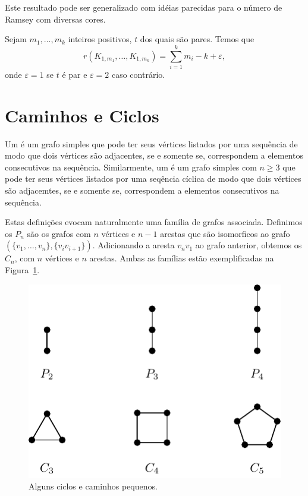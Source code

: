 Este resultado pode ser generalizado com idéias parecidas para o número de Ramsey com diversas cores.

\begin{theorem}
Sejam $m_1, \dots, m_k$ inteiros positivos, $t$ dos quais são pares. Temos que
\[r(K_{1,m_1}, \dotsc,  K_{1,m_k}) = \sum_{i=1}^{k} m_i  - k + \varepsilon,\]
onde $\varepsilon = 1$ se $t$ é par e $\varepsilon = 2$ caso contrário.
\end{theorem}


\section{Caminhos e Ciclos}

Um  é um grafo simples que pode ter seus vértices listados por uma sequência de modo que dois vértices são adjacentes, se e somente se, correspondem a elementos consecutivos na sequência. Similarmente, um  é um grafo simples com $n \geq 3$ que pode ter seus vértices listados por uma seqência cíclica de modo que dois vértices são adjacemtes, se e somente se, correspondem a elementos consecutivos na sequência.

Estas definições evocam naturalmente uma família de grafos associada. Definimos os  $P_n$ são os grafos com $n$ vértices e $n-1$ arestas que são isomorficos ao grafo $(\{v_1,\dots,v_n\}, \{v_iv_{i+1}\})$. Adicionando a aresta $v_nv_1$ ao grafo anterior, obtemos os  $C_n$, com $n$ vértices e $n$ arestas. Ambas as famílias estão exemplificadas na Figura~\ref{graph:fig:cyclepath}.

\begin{figure}[ht!]
\centering
\includegraphics{figures/3_graph_2_cyclepath}
\caption{Alguns ciclos e caminhos pequenos.}
\label{graph:fig:cyclepath}
\end{figure}

